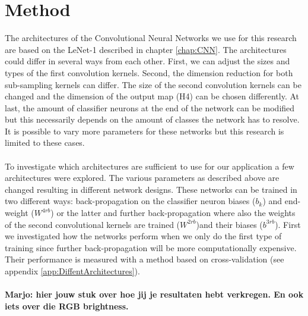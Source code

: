 \documentclass[a4paper,onecolumn]{report}
\begin{document}
\begin{small}
\begin{equation}
\end{equation}
\end{small}


\chapter{Method}
\label{chap:method}
The architectures of the Convolutional Neural Networks we use for this research are based on the LeNet-1 described in chapter \ref{chap:CNN}. The architectures could differ in several ways from each other. First, we can adjust the sizes and types of the first convolution kernels. Second, the dimension reduction for both sub-sampling kernels can differ. The size of the second convolution kernels can be changed and the dimension of the output map (H4) can be chosen differently. At last, the amount of classifier neurons at the end of the network can be modified but this necessarily depends on the amount of classes the network has to resolve.  It is possible to vary more parameters for these networks but this research is limited to these cases. 
\\\\
To investigate which architectures are sufficient to use for our application a few architectures were explored. The various parameters as described above are changed resulting in different network designs. These networks can be trained in two different ways: back-propagation on the classifier neuron biases ($b_{k}$) and end-weight ($ W^{4rb}$) or the latter and further back-propagation where also the weights of the second convolutional kernels are trained ($ W^{2rb} $)and their biases ($b^{3rb}$). First we investigated how the networks perform when we only do the first type of training since further back-propagation will be more computationally expensive. Their performance is measured with a method based on cross-validation (see appendix \ref{app:DiffentArchitectures}). 
\\\\
\textbf{Marjo: hier jouw stuk over hoe jij je resultaten hebt verkregen. En ook iets over die RGB brightness. }
\\\\
\end{document}
